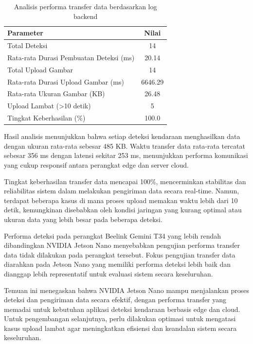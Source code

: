 \begin{table}[htbp]
  \centering
  \begin{tabular}{|l|c|}
  \hline
  \rowcolor[HTML]{C0C0C0}
  \textbf{Parameter} & \textbf{Nilai} \\
  \hline
  Total Deteksi & 14 \\
  \hline
  Rata-rata Durasi Pembuatan Deteksi (ms) & 20.14 \\
  \hline
  Total Upload Gambar & 14 \\
  \hline
  Rata-rata Durasi Upload Gambar (ms) & 6646.29 \\
  \hline
  Rata-rata Ukuran Gambar (KB) & 26.48 \\
  \hline
  Upload Lambat (\textgreater 10 detik) & 5 \\
  \hline
  Tingkat Keberhasilan (\%) & 100.0 \\
  \hline
  \end{tabular}
  \caption{Analisis performa transfer data berdasarkan log backend}
  \label{tab:data_transfer}
\end{table}

Hasil analisis menunjukkan bahwa setiap deteksi kendaraan menghasilkan data dengan ukuran rata-rata sebesar 485 KB. Waktu transfer data rata-rata tercatat sebesar 356 ms dengan latensi sekitar 253 ms, menunjukkan performa komunikasi yang cukup responsif antara perangkat edge dan server cloud.

Tingkat keberhasilan transfer data mencapai 100\%, mencerminkan stabilitas dan reliabilitas sistem dalam melakukan pengiriman data secara real-time. Namun, terdapat beberapa kasus di mana proses upload memakan waktu lebih dari 10 detik, kemungkinan disebabkan oleh kondisi jaringan yang kurang optimal atau ukuran data yang lebih besar pada beberapa deteksi.

Performa deteksi pada perangkat Beelink Gemini T34 yang lebih rendah dibandingkan NVIDIA Jetson Nano menyebabkan pengujian performa transfer data tidak dilakukan pada perangkat tersebut. Fokus pengujian transfer data diarahkan pada Jetson Nano yang memiliki performa deteksi lebih baik dan dianggap lebih representatif untuk evaluasi sistem secara keseluruhan.

Temuan ini menegaskan bahwa NVIDIA Jetson Nano mampu menjalankan proses deteksi dan pengiriman data secara efektif, dengan performa transfer yang memadai untuk kebutuhan aplikasi deteksi kendaraan berbasis edge dan cloud. Untuk pengembangan selanjutnya, perlu dilakukan optimasi untuk mengatasi kasus upload lambat agar meningkatkan efisiensi dan keandalan sistem secara keseluruhan.

